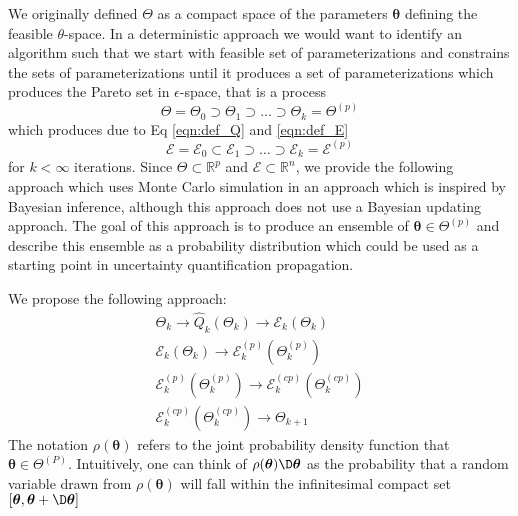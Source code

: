 We originally defined $\Theta$ as a compact space of the parameters ${\bm{\theta}}$ defining the feasible $\theta$-space.  In a deterministic approach we would want to identify an algorithm such that we start with feasible set of parameterizations and constrains the sets of parameterizations until it produces a set of parameterizations which produces the Pareto set in $\epsilon$-space, that is a process
\begin{equation}
    \Theta = \Theta_0 \supset \Theta_1 \supset \hdots \supset \Theta_k = \Theta^{(p)}
\end{equation}
which produces due to Eq \ref{eqn:def_Q} and \ref{eqn:def_E}
\begin{equation}
    \mathcal{E} = \mathcal{E}_0 \subset \mathcal{E}_1 \supset \hdots \supset \mathcal{E}_k = \mathcal{E}^{(p)}
\end{equation}
for $k < \infty$ iterations.  Since $\Theta \subset \mathbb{R}^p$ and $\mathcal{E} \subset \mathbb{R}^n$, we provide the following approach which uses Monte Carlo simulation in an approach which is inspired by Bayesian inference, although this approach does not use a Bayesian updating approach.  The goal of this approach is to produce an ensemble of $\bm{\theta}\in \Theta^{(p)}$ and describe this ensemble as a probability distribution which could be used as a starting point in uncertainty quantification propagation.

We propose the following approach:
\begin{subequations}
\begin{gather}
      \Theta_k \rightarrow \hat{Q}_k(\Theta_k) \rightarrow \mathcal{E}_k(\Theta_k) \\
      \mathcal{E}_k(\Theta_k) \rightarrow \mathcal{E}_k^{(p)}(\Theta_k^{(p)}) \\
      \mathcal{E}_k^{(p)}(\Theta_k^{(p)}) \rightarrow \mathcal{E}_k^{(cp)}(\Theta_k^{(cp)}) \\
      \mathcal{E}_k^{(cp)}(\Theta_k^{(cp)}) \rightarrow \Theta_{k+1}
\end{gather}
\end{subequations}
The notation $\rho(\bm{\theta})$ refers to the joint probability density function that $\bm{\theta} \in \Theta^(P)$.  Intuitively, one can think of $\rho(\bm{\theta})\D\bm{\theta}$ as the probability that a random variable drawn from $\rho(\bm{\theta})$ will fall within the infinitesimal compact set $[\bm{\theta},\bm{\theta}+\D\bm{\theta}]$

